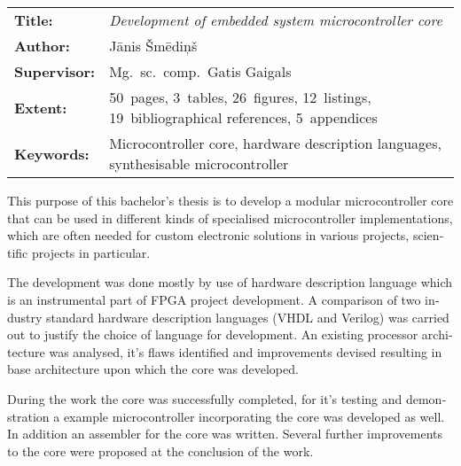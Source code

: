 \clearpage
\begin{english} %
	\abstitlestyle{\abstractname} %
	\noindent%
	\begin{tabularx}{\textwidth}{lX}
		\textbf{Title:} & 
			\textit{Development of embedded system microcontroller core}\\[1ex]
		\textbf{Author:} & Jānis Šmēdiņš\\[1ex]
		\textbf{Supervisor:} & Mg.~sc.~comp.~Gatis Gaigals\\[1ex]
		\textbf{Extent:} & 50~pages, 3~tables, 26~figures, 12~listings,
			19~bibliographical references, 5~appendices\\[1ex]
		\textbf{Keywords:} & Microcontroller core, hardware description languages,
				synthesisable microcontroller
	\end{tabularx}
	
	\vspace{1em}
	This purpose of this bachelor's thesis is to develop a modular 
	microcontroller core that can be used in 
	different kinds of specialised microcontroller implementations,
	which are often needed for custom electronic solutions in various projects,
	scientific projects in particular.
	
	The development was done mostly by use of hardware description
	language which is an instrumental part of FPGA project development.
	A comparison of two industry standard hardware description languages
	(VHDL and Verilog) was carried out to justify the choice of language for development.
	An existing processor architecture was analysed, it's flaws identified
	and improvements devised resulting in base architecture upon which
	the core was developed.
	
	During the work the core was successfully completed, for it's testing
	and demonstration a example microcontroller incorporating the core
	was developed as well. In addition an assembler for the core was written.
	Several further improvements to the core were proposed at the conclusion
	of the work.
\end{english}

